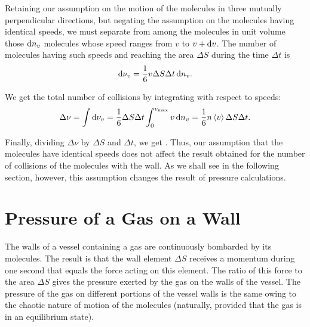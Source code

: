 Retaining our assumption on the motion of the molecules in three mutually perpendicular directions, but negating the assumption on the molecules having identical speeds, we must separate from among the molecules in unit volume those $\mathrm{d} n_v$ molecules whose speed ranges from $v$ to $v+\mathrm{d} v$. The number of molecules having such speeds and reaching the area $\Delta S$ during the time $\Delta t$ is
\begin{equation}\label{eq:11_25}
	\mathrm{d}\nu_v = \frac{1}{6}v\Delta S \Delta t\,\mathrm{d} n_v.
\end{equation}

\noindent
We get the total number of collisions by integrating  with respect to speeds:
\begin{equation*}
	\Delta\nu = \int \mathrm{d}\nu_v = \frac{1}{6} \Delta S \Delta t \int_{0}^{v_{\text{max}}} v\,\mathrm{d} n_v = \frac{1}{6}n \left\langle v \right\rangle\Delta S \Delta t.
\end{equation*}

\noindent
Finally, dividing $\Delta\nu$ by $\Delta S$ and $\Delta t$, we get . Thus, our assumption that the molecules have identical speeds does not affect the result obtained for the number of collisions of the molecules with the wall. As we shall see in the following section, however, this assumption changes the result of pressure calculations.

\section{Pressure of a Gas on a Wall}\label{sec:11_4}

The walls of a vessel containing a gas are continuously bombarded by its molecules. The result is that the wall element $\Delta S$ receives a momentum during one second that equals the force acting on this element. The ratio of this force to the area $\Delta S$ gives the pressure exerted by the gas on the walls of the vessel. The pressure of the gas on different portions of the vessel walls is the same owing to the chaotic nature of motion of the molecules (naturally, provided that the gas is in an equilibrium state).


